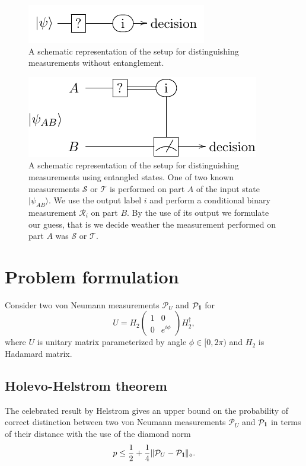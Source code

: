 \documentclass[11pt,a4paper,reqno, oneside]{amsart}
\newcommand{\ket}[1]{\ensuremath{|#1\rangle}}
\newcommand{\1}{{\rm 1\hspace{-0.9mm}l}}
\newcommand{\Id}{{\rm 1\hspace{-0.9mm}l}}
\newcommand{\TT}{\mathcal{T}}
\newcommand{\PP}{\mathcal{P}}
\begin{document}
\begin{figure}[h!]
	\centering
	\includegraphics[width=0.7\linewidth]{gatewe.pdf}
	\caption{
		A schematic representation of the setup for distinguishing 
		measurements without entanglement.}
	\label{fig:non-ent-disc}
\end{figure}


\begin{figure}[h!]
	\centering 
	\includegraphics[width=0.9\linewidth]{gates1.pdf} 
	
	\caption{ A schematic representation of the setup for distinguishing
		measurements using entangled states. One of two known measurements $\mathcal{S}$
		or $\TT$ is performed on part $A$ of the input state $\ket{\psi_{AB}}$. We use
		the output label $i$ and perform a conditional binary measurement
		$\mathcal{R}_i$ on part $B$. By the use of its output we formulate our guess, 
		that is we decide  
		weather
		the measurement performed on part $A$ was $\mathcal{S}$ or $\TT$.
	}\label{fig:diamond}
\end{figure}



\newpage
\section{Problem formulation } 
Consider two von Neumann measurements $\PP_U$ and $\PP_{\Id}$ for  \begin{equation}
U = H_2 \left(\begin{array}{cc}1&0\\0&e^{i \phi}\end{array}\right)  H_2^\dagger,
\end{equation}
where
$U$ is unitary matrix parameterized by angle $\phi \in [0, 2\pi)$ and $H_2$ is Hadamard matrix. 

\subsection{Holevo-Helstrom theorem}
The celebrated result by Helstrom gives an upper
bound on the probability of correct distinction between two von Neumann measurements
$\PP_U$ and $\PP_{\Id}$ in terms of their distance with the use of the diamond norm
\begin{equation}
p \leq \frac12 + \frac14 \| \PP_U - \PP_{\Id} \|_\diamond.
\end{equation}
\end{document}
